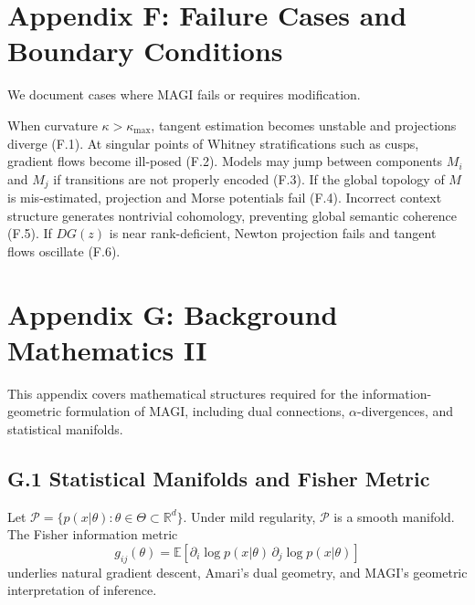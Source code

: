 \documentclass[11pt,a4paper,twocolumn]{article}
\begin{document}

\section*{Appendix F: Failure Cases and Boundary Conditions}

We document cases where MAGI fails or requires modification.

When curvature $\kappa > \kappa_{\max}$, tangent estimation becomes
unstable and projections diverge (F.1). At singular points of Whitney
stratifications such as cusps, gradient flows become ill-posed (F.2).
Models may jump between components $M_i$ and $M_j$ if transitions are
not properly encoded (F.3). If the global topology of $M$ is
mis-estimated, projection and Morse potentials fail (F.4). Incorrect
context structure generates nontrivial cohomology, preventing global
semantic coherence (F.5). If $DG(z)$ is near rank-deficient, Newton
projection fails and tangent flows oscillate (F.6).


\section*{Appendix G: Background Mathematics II}

This appendix covers mathematical structures required for the
information-geometric formulation of MAGI, including dual connections,
$\alpha$-divergences, and statistical manifolds.

\subsection*{G.1 Statistical Manifolds and Fisher Metric}

Let $\mathcal{P} = \{ p(x|\theta) : \theta \in \Theta \subset
\mathbb{R}^d \}$. Under mild regularity, $\mathcal{P}$ is a smooth
manifold. The Fisher information metric
\[
g_{ij}(\theta) =
\mathbb{E}\left[
\partial_i \log p(x|\theta)
\,
\partial_j \log p(x|\theta)
\right]
\]
underlies natural gradient descent, Amari's dual geometry, and MAGI's
geometric interpretation of inference.
\end{document}

